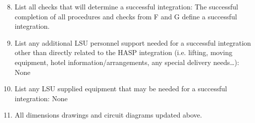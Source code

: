 \hspace*{0.5cm}
\begin{minipage}{\linewidth-0.5cm}
  \begin{enumerate}[label = \Alph*]
    \setcounter{enumi}{7}
      
        \begin{enumerate}[label = -]
          \item Communications System:
          \begin{enumerate}
            \item Successful communication with and downlink to the HASP platform.
            \item Appropriate data storage (do a self-check and verify data collection rate).
          \end{enumerate}
        \end{enumerate}

        \begin{enumerate}[label = -]
          \item Environmental System Check:
          \begin{enumerate}
            \item Thermal and vacuum tests completed successfully for each system.
            \item Do a system health check.
          \end{enumerate}
        \end{enumerate}

  \item List all checks that will determine a successful integration:
        The successful completion of all procedures and checks from F and G define a successful integration.

  \item List any additional LSU personnel support needed for a successful integration other than directly related to the HASP integration (i.e. lifting, moving equipment, hotel information/arrangements, any special delivery needs…): None

  \item List any LSU supplied equipment that may be needed for a successful integration: None

  \item All dimensions drawings and circuit diagrams updated above.
    
  \end{enumerate}
\end{minipage}

